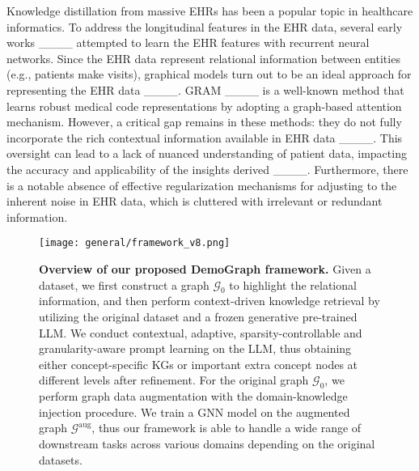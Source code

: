 Knowledge distillation from massive EHRs has been a popular topic in healthcare informatics. 
%
To address the longitudinal features in the EHR data, several early works ____ attempted to learn the EHR features with recurrent neural networks.
%
Since the EHR data represent relational information between entities (e.g., patients make visits), graphical models turn out to be an ideal approach for representing the EHR data ____.
%
GRAM ____ is a well-known method that learns robust medical code representations by adopting a graph-based attention mechanism.
%
However, a critical gap remains in these methods: they do not fully incorporate the rich contextual information available in EHR data ____. This oversight can lead to a lack of nuanced understanding of patient data, impacting the accuracy and applicability of the insights derived ____. 
%
Furthermore, there is a notable absence of effective regularization mechanisms for adjusting to the inherent noise in EHR data, which is cluttered with irrelevant or redundant information.
% 



\begin{figure*}
    \centering
    \texttt{[image: general/framework\_v8.png]}
    \caption{\textbf{Overview of our proposed DemoGraph framework.} \textnormal{Given a dataset, we first construct a 
    graph \( \mathcal{G}_0 \) to highlight the relational information, and
    then perform context-driven knowledge retrieval by utilizing the original dataset and a frozen generative pre-trained LLM. We conduct contextual, adaptive, sparsity-controllable and granularity-aware prompt learning on the LLM, thus obtaining either concept-specific KGs or important extra concept nodes at different levels after refinement. For the original graph \( \mathcal{G}_0 \), we perform graph data augmentation with the domain-knowledge injection procedure. 
    We train a GNN model on the augmented graph \( \mathcal{G}^\text{aug} \), thus our framework is able to handle a wide range of downstream tasks across various domains depending on the original datasets. }}
    \label{fig: framework}
\end{figure*} 

